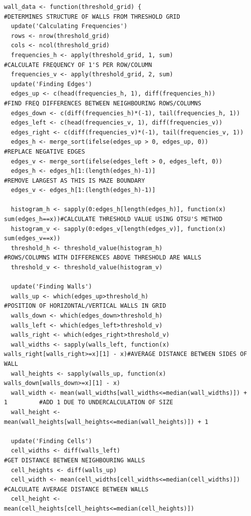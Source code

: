 \documentclass[titlepage]{article}
\begin{document}
\begin{changemargin}{-1in}{-1in}
\begin{verbatim}
wall_data <- function(threshold_grid) {                                         #DETERMINES STRUCTURE OF WALLS FROM THRESHOLD GRID
  update('Calculating Frequencies')
  rows <- nrow(threshold_grid)
  cols <- ncol(threshold_grid)
  frequencies_h <- apply(threshold_grid, 1, sum)                                #CALCULATE FREQUENCY OF 1'S PER ROW/COLUMN
  frequencies_v <- apply(threshold_grid, 2, sum)
  update('Finding Edges')
  edges_up <- c(head(frequencies_h, 1), diff(frequencies_h))                    #FIND FREQ DIFFERENCES BETWEEN NEIGHBOURING ROWS/COLUMNS
  edges_down <- c(diff(frequencies_h)*(-1), tail(frequencies_h, 1))
  edges_left <- c(head(frequencies_v, 1), diff(frequencies_v))
  edges_right <- c(diff(frequencies_v)*(-1), tail(frequencies_v, 1))
  edges_h <- merge_sort(ifelse(edges_up > 0, edges_up, 0))                      #REPLACE NEGATIVE EDGES
  edges_v <- merge_sort(ifelse(edges_left > 0, edges_left, 0))
  edges_h <- edges_h[1:(length(edges_h)-1)]                                     #REMOVE LARGEST AS THIS IS MAZE BOUNDARY
  edges_v <- edges_h[1:(length(edges_h)-1)]

  histogram_h <- sapply(0:edges_h[length(edges_h)], function(x) sum(edges_h==x))#CALCULATE THRESHOLD VALUE USING OTSU'S METHOD
  histogram_v <- sapply(0:edges_v[length(edges_v)], function(x) sum(edges_v==x))
  threshold_h <- threshold_value(histogram_h)                                   #ROWS/COLUMNS WITH DIFFERENCES ABOVE THRESHOLD ARE WALLS
  threshold_v <- threshold_value(histogram_v)

  update('Finding Walls')
  walls_up <- which(edges_up>threshold_h)                                       #POSITION OF HORIZONTAL/VERTICAL WALLS IN GRID
  walls_down <- which(edges_down>threshold_h)
  walls_left <- which(edges_left>threshold_v)
  walls_right <- which(edges_right>threshold_v)
  wall_widths <- sapply(walls_left, function(x) walls_right[walls_right>=x][1] - x)#AVERAGE DISTANCE BETWEEN SIDES OF WALL
  wall_heights <- sapply(walls_up, function(x) walls_down[walls_down>=x][1] - x)
  wall_width <- mean(wall_widths[wall_widths<=median(wall_widths)]) + 1         #ADD 1 DUE TO UNDERCALCULATION OF SIZE
  wall_height <- mean(wall_heights[wall_heights<=median(wall_heights)]) + 1

  update('Finding Cells')
  cell_widths <- diff(walls_left)                                               #GET DISTANCE BETWEEN NEIGHBOURING WALLS
  cell_heights <- diff(walls_up)
  cell_width <- mean(cell_widths[cell_widths<=median(cell_widths)])             #CALCULATE AVERAGE DISTANCE BETWEEN WALLS
  cell_height <- mean(cell_heights[cell_heights<=median(cell_heights)])


\end{verbatim}
\end{changemargin}
\end{document}
